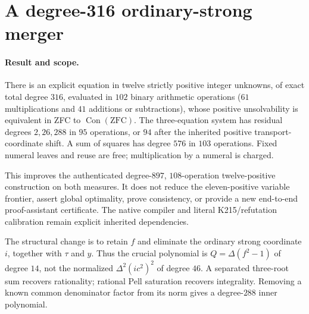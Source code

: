 \section{A degree-316 ordinary-strong merger}
\label{sec:ordinary-merger}

\paragraph{Result and scope.}
There is an explicit equation in twelve strictly positive integer unknowns,
of exact total degree $316$, evaluated in $102$ binary arithmetic operations
($61$ multiplications and $41$ additions or subtractions), whose positive
unsolvability is equivalent in ZFC to $\operatorname{Con}(\mathrm{ZFC})$.
The three-equation system has residual degrees $2,26,288$ in $95$ operations,
or $94$ after the inherited positive transport-coordinate shift. A sum of
squares has degree $576$ in $103$ operations. Fixed numeral leaves and reuse
are free; multiplication by a numeral is charged.

This improves the authenticated degree-$897$, $108$-operation twelve-positive
construction on both measures. It does not reduce the eleven-positive
variable frontier, assert global optimality, prove consistency, or provide
a new end-to-end proof-assistant certificate. The native compiler and literal
K215/refutation calibration remain explicit inherited dependencies.

The structural change is to retain $f$ and eliminate the ordinary strong
coordinate $i$, together with $\tau$ and $y$. Thus the crucial polynomial is
$Q=\Delta(f^2-1)$ of degree $14$, not the normalized
$\Delta^2(ic^2)^2$ of degree $46$. A separated three-root sum recovers
rationality; rational Pell saturation recovers integrality. Removing a known
common denominator factor from its norm gives a degree-$288$ inner polynomial.

